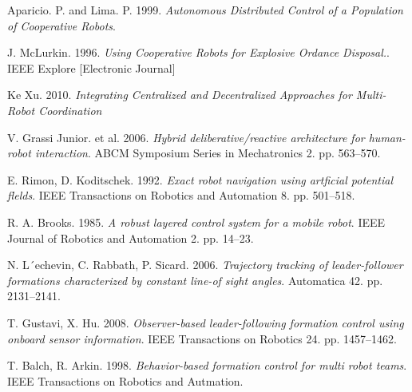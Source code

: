 \begin{thebibliography}{19}

Aparicio. P. and Lima. P. 1999. \emph{Autonomous Distributed Control of a Population of Cooperative Robots}.


J. McLurkin. 1996. \emph{Using Cooperative Robots for Explosive Ordance Disposal.}. IEEE Explore [Electronic
Journal]

Ke Xu. 2010. \emph{Integrating Centralized and Decentralized Approaches for Multi-Robot Coordination}

V. Grassi Junior. et al. 2006. \emph{Hybrid deliberative/reactive architecture for human-robot interaction}. ABCM Symposium Series in Mechatronics 2. pp. 563–570.

E. Rimon, D. Koditschek. 1992. \emph{Exact robot navigation using artficial potential flelds}. IEEE Transactions on Robotics and Automation 8. pp. 501–518.

R. A. Brooks. 1985. \emph{A robust layered control system for a mobile robot}. IEEE Journal of Robotics and Automation 2. pp. 14–23.

N. L´echevin, C. Rabbath, P. Sicard. 2006. \emph{Trajectory tracking of leader-follower formations characterized by constant line-of sight angles}. Automatica 42. pp. 2131–2141.

T. Gustavi, X. Hu. 2008. \emph{Observer-based leader-following formation control using onboard sensor information}. IEEE Transactions on Robotics 24. pp. 1457–1462.

T. Balch, R. Arkin. 1998. \emph{Behavior-based formation control for multi robot teams}. IEEE Transactions on Robotics and Autmation.


\end{thebibliography}
